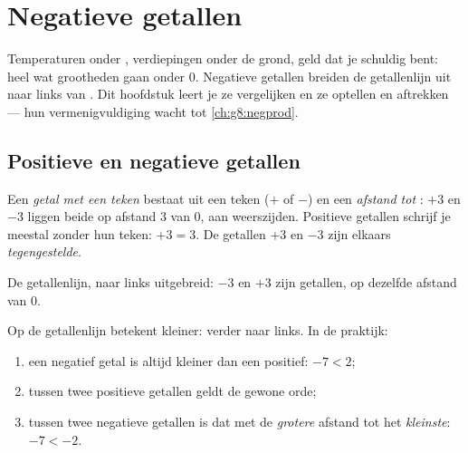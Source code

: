 \chapter{Negatieve getallen}\label{ch:g7:negatives}

Temperaturen onder , verdiepingen onder de grond, geld dat je schuldig bent:
heel wat grootheden gaan onder $0$. Negatieve getallen breiden de getallenlijn
uit naar links van . Dit hoofdstuk leert je ze vergelijken en ze optellen en
aftrekken --- hun vermenigvuldiging wacht tot \cref{ch:g8:negprod}.

\section{Positieve en negatieve getallen}

\begin{definition}\label{def:g7:negatives:def}
Een \emph{getal met een teken} bestaat uit een teken
($+$ of $-$) en een \emph{afstand tot }: $+3$ en $-3$ liggen beide op afstand
$3$ van $0$, aan weerszijden. Positieve getallen schrijf je meestal zonder hun
teken: $+3 = 3$. De getallen $+3$ en $-3$ zijn elkaars
\emph{tegengestelde}.
\end{definition}

\begin{omfigure}

{\small De getallenlijn, naar links uitgebreid: $-3$ en $+3$ zijn 
getallen, op dezelfde afstand van $0$.}
\end{omfigure}

\begin{method}\label{met:g7:negatives:compare}
Op de getallenlijn betekent kleiner: verder naar links. In de praktijk:
\begin{enumerate}
  \item een negatief getal is altijd kleiner dan een positief: $-7 < 2$;
  \item tussen twee positieve getallen geldt de gewone orde;
  \item tussen twee negatieve getallen is dat met de \emph{grotere} afstand tot
         het \emph{kleinste}: $-7 < -2$.
\end{enumerate}
\end{method}

